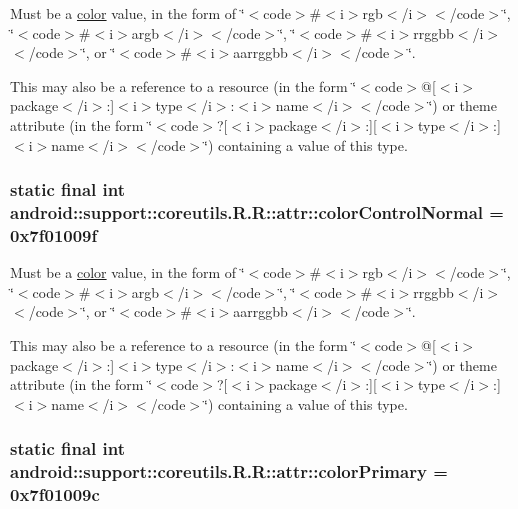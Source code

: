 Must be a \hyperlink{classandroid_1_1support_1_1coreutils_1_1_r_1_1color}{color} value, in the form of \char`\"{}$<$code$>$\#$<$i$>$rgb$<$/i$>$$<$/code$>$\char`\"{}, \char`\"{}$<$code$>$\#$<$i$>$argb$<$/i$>$$<$/code$>$\char`\"{}, \char`\"{}$<$code$>$\#$<$i$>$rrggbb$<$/i$>$$<$/code$>$\char`\"{}, or \char`\"{}$<$code$>$\#$<$i$>$aarrggbb$<$/i$>$$<$/code$>$\char`\"{}. 

This may also be a reference to a resource (in the form \char`\"{}$<$code$>$@\mbox{[}$<$i$>$package$<$/i$>$:\mbox{]}$<$i$>$type$<$/i$>$:$<$i$>$name$<$/i$>$$<$/code$>$\char`\"{}) or theme attribute (in the form \char`\"{}$<$code$>$?\mbox{[}$<$i$>$package$<$/i$>$:\mbox{]}\mbox{[}$<$i$>$type$<$/i$>$:\mbox{]}$<$i$>$name$<$/i$>$$<$/code$>$\char`\"{}) containing a value of this type. \hypertarget{classandroid_1_1support_1_1coreutils_1_1_r_1_1attr_724ca33cd87491f83ff66d2c18cbf73d}{
\subsubsection[{colorControlNormal}]{\setlength{\rightskip}{0pt plus 5cm}static final int android::support::coreutils.R.R::attr::colorControlNormal = 0x7f01009f}}
\label{classandroid_1_1support_1_1coreutils_1_1_r_1_1attr_724ca33cd87491f83ff66d2c18cbf73d}


Must be a \hyperlink{classandroid_1_1support_1_1coreutils_1_1_r_1_1color}{color} value, in the form of \char`\"{}$<$code$>$\#$<$i$>$rgb$<$/i$>$$<$/code$>$\char`\"{}, \char`\"{}$<$code$>$\#$<$i$>$argb$<$/i$>$$<$/code$>$\char`\"{}, \char`\"{}$<$code$>$\#$<$i$>$rrggbb$<$/i$>$$<$/code$>$\char`\"{}, or \char`\"{}$<$code$>$\#$<$i$>$aarrggbb$<$/i$>$$<$/code$>$\char`\"{}. 

This may also be a reference to a resource (in the form \char`\"{}$<$code$>$@\mbox{[}$<$i$>$package$<$/i$>$:\mbox{]}$<$i$>$type$<$/i$>$:$<$i$>$name$<$/i$>$$<$/code$>$\char`\"{}) or theme attribute (in the form \char`\"{}$<$code$>$?\mbox{[}$<$i$>$package$<$/i$>$:\mbox{]}\mbox{[}$<$i$>$type$<$/i$>$:\mbox{]}$<$i$>$name$<$/i$>$$<$/code$>$\char`\"{}) containing a value of this type. \hypertarget{classandroid_1_1support_1_1coreutils_1_1_r_1_1attr_dccfafcc3fe254276331d3e339d33cb1}{
\subsubsection[{colorPrimary}]{\setlength{\rightskip}{0pt plus 5cm}static final int android::support::coreutils.R.R::attr::colorPrimary = 0x7f01009c}}
\label{classandroid_1_1support_1_1coreutils_1_1_r_1_1attr_dccfafcc3fe254276331d3e339d33cb1}


